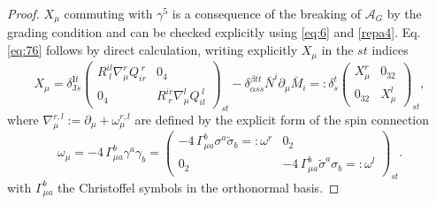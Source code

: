 \documentclass[11pt]{article}
\newcommand{\A}{\mathcal A}
\newcommand{\del}{\partial}
\newcommand{\sI}{\mathrm  I}
\newcommand{\sJ}{\mathrm J}
\begin{document}
\begin{proof}
$X_\mu$ commuting with
$\gamma^5$ is a consequence of the breaking of $\A_G$ by the
grading condition and can be checked explicitly using \eqref{eq:6} and
\eqref{repa4}. Eq. \eqref{eq:76} follows by direct calculation, writing explicitly
 $X_\mu$ in the $st$ indices
\begin{equation}
  \label{eq:147}
  X_\mu = \delta^{\sI \dot t}_{\sJ\dot s} \left(\begin{array}{cc} 
R^{il}_{\; l}\nabla^r_\mu Q^{\;r}_{ir} & 0_4 \\ 
0_4 &R^{ir}_{\; r}\nabla^l_\mu Q^{\;l}_{il}\end{array}\right)_{st} - \delta_{\alpha s
\dot s}^{\beta t \dot t}\bar N ^i \del_\mu \bar M_i =:  \delta^{\dot t}_{\dot s} \left(\begin{array}{cc}X_\mu^r &
0_{32}\\ 0_{32} &X_\mu^l \end{array}\right)_{st},
\end{equation}
where $\nabla_\mu^{r,l}:= \del_\mu + \omega_\mu^{r,l}$ are defined by the explicit form of the spin connection
\begin{equation}
\omega_\mu =-4
\,\Gamma_{\mu a}^b \gamma^a\gamma_b= \left(\begin{array}{cc}
-4
\,\Gamma_{\mu a}^b\sigma^a \tilde\sigma_b =: \omega^r & 0_2 \\ 0_2
&-4
\,\Gamma_{\mu a}^b\tilde\sigma^a\sigma_b=: \omega^l \end{array}\right)_{st}.
\label{eq:74}
\end{equation}
with $\Gamma_{\mu a}^b$ the Christoffel symbols in the orthonormal
basis.
\end{proof}
   
\end{document}

